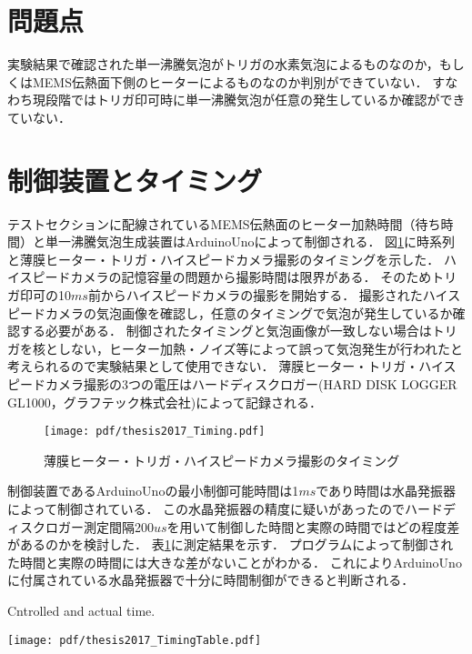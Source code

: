 \section{問題点}
実験結果で確認された単一沸騰気泡がトリガの水素気泡によるものなのか，もしくはMEMS伝熱面下側のヒーターによるものなのか判別ができていない．
すなわち現段階ではトリガ印可時に単一沸騰気泡が任意の発生しているか確認ができていない．


\section{制御装置とタイミング}
テストセクションに配線されているMEMS伝熱面のヒーター加熱時間（待ち時間）と単一沸騰気泡生成装置はArduinoUnoによって制御される．
図\ref{Timing}に時系列と薄膜ヒーター・トリガ・ハイスピードカメラ撮影のタイミングを示した．
ハイスピードカメラの記憶容量の問題から撮影時間は限界がある．
そのためトリガ印可の10$ ms $前からハイスピードカメラの撮影を開始する．
撮影されたハイスピードカメラの気泡画像を確認し，任意のタイミングで気泡が発生しているか確認する必要がある．
制御されたタイミングと気泡画像が一致しない場合はトリガを核としない，ヒーター加熱・ノイズ等によって誤って気泡発生が行われたと考えられるので実験結果として使用できない．
薄膜ヒーター・トリガ・ハイスピードカメラ撮影の3つの電圧はハードディスクロガー(HARD DISK LOGGER GL1000，グラフテック株式会社)によって記録される．

\begin{figure}[ht]
\vspace{1zh}
 \begin{center}
  \texttt{[image: pdf/thesis2017\_Timing.pdf]}
  \vspace{-1.5zh}
  \caption{薄膜ヒーター・トリガ・ハイスピードカメラ撮影のタイミング}\label{Timing}
 \end{center}
 \vspace{0zh}
\end{figure}

制御装置であるArduinoUnoの最小制御可能時間は1$ ms $であり時間は水晶発振器によって制御されている．
この水晶発振器の精度に疑いがあったのでハードディスクロガー測定間隔200$ us $を用いて制御した時間と実際の時間ではどの程度差があるのかを検討した．
表\ref{Timing}に測定結果を示す．
プログラムによって制御された時間と実際の時間には大きな差がないことがわかる．
これによりArduinoUnoに付属されている水晶発振器で十分に時間制御ができると判断される．

\begin{table}[h]
  \begin{center}
  \caption{Cntrolled and actual time.}\label{プログラムによる制御時間と実際の時間}
  \vspace{0.5zh}
   \texttt{[image: pdf/thesis2017\_TimingTable.pdf]}
   \end{center}
   \vspace{0zh}
\end{table}



